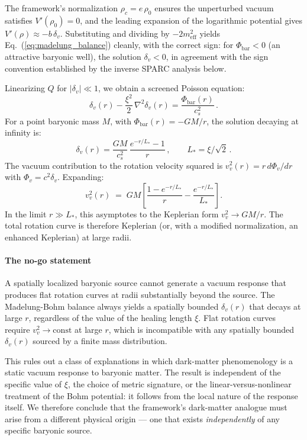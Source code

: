 \documentclass[12pt, a4paper]{article}
\begin{document}
The framework's normalization $\rho_c = e\,\rho_0$ ensures the unperturbed vacuum satisfies $V'(\rho_0) = 0$, and the leading expansion of the logarithmic potential gives $V'(\rho) \approx -b\,\delta_v$. Substituting and dividing by $-2m_\mathrm{eff}^2$ yields Eq.~(\ref{eq:madelung_balance}) cleanly, with the correct sign: for $\Phi_\mathrm{bar} < 0$ (an attractive baryonic well), the solution $\delta_v < 0$, in agreement with the sign convention established by the inverse SPARC analysis below.

Linearizing $Q$ for $|\delta_v| \ll 1$, we obtain a screened Poisson equation:
\begin{equation}
    \delta_v(r) - \frac{\xi^2}{2}\,\nabla^2 \delta_v(r) =
    \frac{\Phi_\mathrm{bar}(r)}{c_s^2}\,.
\label{eq:screened_poisson}
\end{equation}
For a point baryonic mass $M$, with $\Phi_\mathrm{bar}(r) = -GM/r$, the solution decaying at infinity is:
\begin{equation}
    \delta_v(r) = \frac{GM}{c_s^2}\,
    \frac{e^{-r/L_\ast} - 1}{r}\,, \qquad
    L_\ast = \xi/\sqrt{2}\,.
\label{eq:yukawa_solution}
\end{equation}
The vacuum contribution to the rotation velocity squared is $v_v^2(r) = r\,d\Phi_v/dr$ with $\Phi_v = c^2 \delta_v$. Expanding:
\begin{equation}
    v_v^2(r) \;=\; GM\!\left[\frac{1-e^{-r/L_\ast}}{r} - \frac{e^{-r/L_\ast}}{L_\ast}\right].
\end{equation}
In the limit $r \gg L_\ast$, this asymptotes to the Keplerian form $v_v^2 \to GM/r$. The total rotation curve is therefore Keplerian (or, with a modified normalization, an enhanced Keplerian) at large radii.

\paragraph{The no-go statement}
A spatially localized baryonic source cannot generate a vacuum response that produces flat rotation curves at radii substantially beyond the source. The Madelung-Bohm balance always yields a spatially bounded $\delta_v(r)$ that decays at large $r$, regardless of the value of the healing length $\xi$. Flat rotation curves require $v_v^2 \to \mathrm{const}$ at large $r$, which is incompatible with any spatially bounded $\delta_v(r)$ sourced by a finite mass distribution.

This rules out a class of explanations in which dark-matter phenomenology is a static vacuum response to baryonic matter. The result is independent of the specific value of $\xi$, the choice of metric signature, or the linear-versus-nonlinear treatment of the Bohm potential: it follows from the local nature of the response itself. We therefore conclude that the framework's dark-matter analogue must arise from a different physical origin --- one that exists \emph{independently} of any specific baryonic source.
\end{document}

